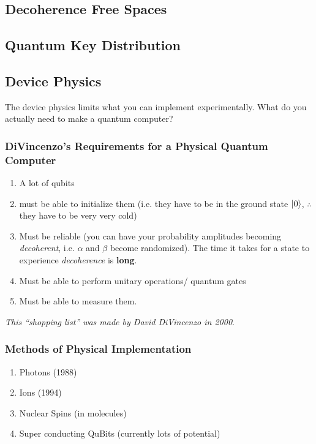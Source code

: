 \documentclass[reprint, amsmath,amssymb, aps]{revtex4-2}
\begin{document}
            \subsection{Decoherence Free Spaces}

        \subsection{Quantum Key Distribution}

        \subsection{Device Physics}
            The device physics limits what you can implement experimentally. What do you actually need to make a quantum computer?
            \subsubsection{DiVincenzo's Requirements for a Physical Quantum Computer}
            \begin{enumerate}
                \item A lot of qubits
                \item must be able to initialize them (i.e. they have to be in the ground state $\ket{0}$, $\therefore$ they have to be very very cold)
                \item Must be reliable (you can have your probability amplitudes becoming \textit{decoherent}, i.e. $\alpha$ and $\beta$ become randomized). The time it takes for a state to experience \textit{decoherence} is \textbf{long}.
                \item Must be able to perform unitary operations/ quantum gates
                \item Must be able to measure them.
                
            \end{enumerate}

            \textit{This ``shopping list'' was made by David DiVincenzo in 2000}.

        \subsubsection{Methods of Physical Implementation}

            \begin{enumerate}
                \item Photons (1988)
                \item Ions (1994)
                \item Nuclear Spins (in molecules)
                \item Super conducting QuBits (currently lots of potential) \label{damn}
            \end{enumerate}
\end{document}

